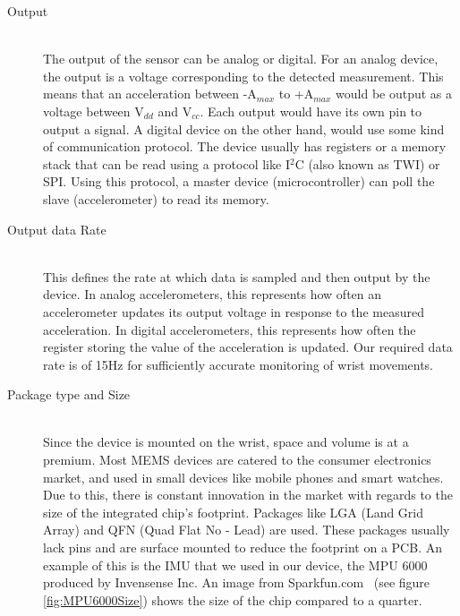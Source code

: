 \begin{description}

\item[Output] \hfill \\
The output of the sensor can be analog or digital. For an analog device, the output is a voltage corresponding to the detected measurement. This means that an acceleration between -A$_{max}$ to +A$_{max}$ would be output as a voltage between V$_{dd}$ and V$_{cc}$. Each output would have its own pin to output a signal. A digital device on the other hand, would use some kind of communication protocol. The device usually has registers or a memory stack that can be read using a protocol like I$^2$C (also known as TWI) or SPI. Using this protocol, a master device (microcontroller) can poll the slave (accelerometer) to read its memory.

\item[Output data Rate] \hfill \\
This defines the rate at which data is sampled and then output by the device. In analog accelerometers, this represents how often an accelerometer updates its output voltage in response to the measured acceleration. In digital accelerometers, this represents how often the register storing the value of the acceleration is updated. Our required data rate is of 15Hz for sufficiently accurate monitoring of wrist movements.

\item[Package type and Size] \hfill \\
Since the device is mounted on the wrist, space and volume is at a premium. Most MEMS devices are catered to the consumer electronics market, and used in small devices like mobile phones and smart watches. Due to this, there is constant innovation in the market with regards to the size of the integrated chip's footprint. Packages like LGA (Land Grid Array) and QFN (Quad Flat No - Lead) are used. These packages usually lack pins and are surface mounted to reduce the footprint on a PCB. An example of this is the IMU that we used in our device, the MPU 6000 produced by Invensense Inc. An image from Sparkfun.com~\cite{Image:SparkfunMPU6000}  (see figure \ref{fig:MPU6000Size}) shows the size of the chip compared to a quarter.


\end{description}
